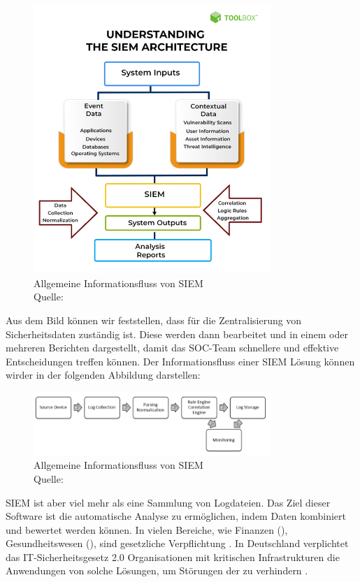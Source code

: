 \begin{figure}[H]
   \centering
   \includegraphics[width=0.8\textwidth]{assets/2_p1.png}
   \caption{Allgemeine Informationsfluss von \gls{SIEM} \\Quelle: \citep{Mohanan_What} }
   \centering
\end{figure}

Aus dem Bild können wir feststellen, dass  für die Zentralisierung von Sicherheitsdaten zuständig ist. Diese werden dann bearbeitet und in einem oder mehreren Berichten dargestellt, damit das \gls{SOC}-Team schnellere und effektive Entscheidungen treffen können. Der Informationsfluss einer \gls{SIEM} Lösung können wirder in der folgenden Abbildung darstellen:

\begin{figure}[H]
   \centering
   \includegraphics[width=0.8\textwidth]{assets/2_p2.png}
   \caption{Allgemeine Informationsfluss von \gls{SIEM} \\Quelle: \citep{Granadillo_SIEM} }
   \centering
\end{figure}

\gls{SIEM} ist aber viel mehr als eine Sammlung von Logdateien. Das Ziel dieser Software ist die automatische Analyse zu ermöglichen, indem Daten kombiniert und bewertet werden können. In vielen Bereiche, wie Finanzen (), Gesundheitswesen (), sind  gesetzliche Verpflichtung \citep{Jog_SIEM}. In Deutschland verplichtet das \gls{IT-Sicherheitsgesetz 2.0} Organisationen mit kritischen Infrastrukturen die Anwendungen von solche Lösungen, um Störungen der  zu verhindern \citep{BSI_ITSG}.

